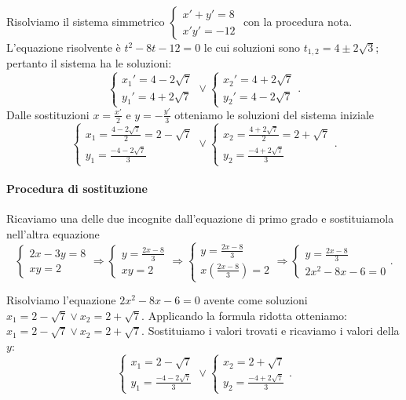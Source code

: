 \begin{exrig}
\begin{esempio}
Risolviamo il sistema simmetrico $\left\{\begin{array}{l}{x'+y'=8}\\{x'y'=-12}\end{array}\right.$ con la procedura nota. L'equazione risolvente è $t^2-8t-12=0$ le cui soluzioni sono $t_{1,2}=4\pm 2\sqrt 3$; pertanto il sistema ha le soluzioni: 
\[\left\{\begin{array}{l}{x_1'=4-2\sqrt 7}\\
{y_1'=4+2\sqrt 7}\end{array}\right.\vee 
\left\{\begin{array}{l}{x_2'=4+2\sqrt 7}\\
{y_2'=4-2\sqrt 7}\end{array}\right..\] 
Dalle sostituzioni $x=\frac{x'} 2$ e $y=-\frac{y'} 3$ otteniamo le soluzioni del sistema iniziale 
\[\left\{\begin{array}{l}{x_1=\frac{4-2\sqrt 7} 2=2-\sqrt 7}\\
{y_1=\frac{-4-2\sqrt 7} 3}\end{array}\right.\vee 
\left\{\begin{array}{l}{x_2=\frac{4+2\sqrt 7} 2=2+\sqrt 7}\\
{y_2=\frac{-4+2\sqrt 7} 3}\end{array}\right..\]
\paragraph{Procedura di sostituzione}
Ricaviamo una delle due incognite dall’equazione di primo grado e sostituiamola nell’altra equazione \[ \left\{\begin{array}{l}{2x-3y=8} \\{{xy}=2}\end{array}\right.\Rightarrow\left\{\begin{array}{l}{y=\frac{2x-8} 3}\\{{xy}=2}\end{array}\right.\Rightarrow \left\{\begin{array}{l}{y=\frac{2x-8} 3}\\{x\left(\frac{2x-8} 3\right)=2}\end{array}\right.\Rightarrow \left\{\begin{array}{l}{y=\frac{2x-8} 3}\\{2x^2-8x-6=0}\end{array}\right.. \]

Risolviamo l'equazione $2x^2-8x-6=0$ avente come soluzioni $x_1=2-\sqrt 7\vee x_2=2+\sqrt 7$. Applicando la formula ridotta otteniamo: $x_1=2-\sqrt 7\vee x_2=2+\sqrt 7$.
Sostituiamo i valori trovati e ricaviamo i valori della $y$: \[ \left\{\begin{array}{l}{x_1=2-\sqrt 7}\\{y_1=\frac{-4-2\sqrt 7} 3}\end{array}\right.\vee \left\{\begin{array}{l}{x_2=2+\sqrt 7}\\{y_2=\frac{-4+2\sqrt 7} 3}\end{array}\right.. \]
\end{esempio}
\end{exrig}
\ovalbox{\risolvi \ref{ese:6.25}}

